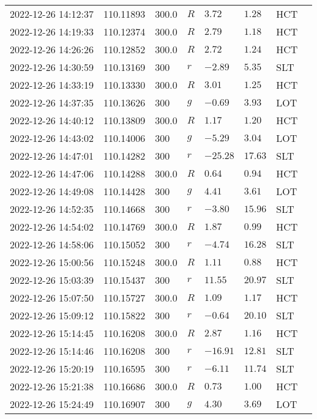 \documentclass{nature_plusfigure}
\begin{document}
\begin{supplement}
\begin{center}
\begin{longtable}{llllllll}
2022-12-26 14:12:37 & 110.11893 & 300.0 & $R$ & $3.72$ & $1.28$ & HCT &  \\ 
2022-12-26 14:19:33 & 110.12374 & 300.0 & $R$ & $2.79$ & $1.18$ & HCT &  \\ 
2022-12-26 14:26:26 & 110.12852 & 300.0 & $R$ & $2.72$ & $1.24$ & HCT &  \\ 
2022-12-26 14:30:59 & 110.13169 & 300 & $r$ & $-2.89$ & $5.35$ & SLT &  \\ 
2022-12-26 14:33:19 & 110.13330 & 300.0 & $R$ & $3.01$ & $1.25$ & HCT &  \\ 
2022-12-26 14:37:35 & 110.13626 & 300 & $g$ & $-0.69$ & $3.93$ & LOT &  \\ 
2022-12-26 14:40:12 & 110.13809 & 300.0 & $R$ & $1.17$ & $1.20$ & HCT &  \\ 
2022-12-26 14:43:02 & 110.14006 & 300 & $g$ & $-5.29$ & $3.04$ & LOT &  \\ 
2022-12-26 14:47:01 & 110.14282 & 300 & $r$ & $-25.28$ & $17.63$ & SLT &  \\ 
2022-12-26 14:47:06 & 110.14288 & 300.0 & $R$ & $0.64$ & $0.94$ & HCT &  \\ 
2022-12-26 14:49:08 & 110.14428 & 300 & $g$ & $4.41$ & $3.61$ & LOT &  \\ 
2022-12-26 14:52:35 & 110.14668 & 300 & $r$ & $-3.80$ & $15.96$ & SLT &  \\ 
2022-12-26 14:54:02 & 110.14769 & 300.0 & $R$ & $1.87$ & $0.99$ & HCT &  \\ 
2022-12-26 14:58:06 & 110.15052 & 300 & $r$ & $-4.74$ & $16.28$ & SLT &  \\ 
2022-12-26 15:00:56 & 110.15248 & 300.0 & $R$ & $1.11$ & $0.88$ & HCT &  \\ 
2022-12-26 15:03:39 & 110.15437 & 300 & $r$ & $11.55$ & $20.97$ & SLT &  \\ 
2022-12-26 15:07:50 & 110.15727 & 300.0 & $R$ & $1.09$ & $1.17$ & HCT &  \\ 
2022-12-26 15:09:12 & 110.15822 & 300 & $r$ & $-0.64$ & $20.10$ & SLT &  \\ 
2022-12-26 15:14:45 & 110.16208 & 300.0 & $R$ & $2.87$ & $1.16$ & HCT &  \\ 
2022-12-26 15:14:46 & 110.16208 & 300 & $r$ & $-16.91$ & $12.81$ & SLT &  \\ 
2022-12-26 15:20:19 & 110.16595 & 300 & $r$ & $-6.11$ & $11.74$ & SLT &  \\ 
2022-12-26 15:21:38 & 110.16686 & 300.0 & $R$ & $0.73$ & $1.00$ & HCT &  \\ 
2022-12-26 15:24:49 & 110.16907 & 300 & $g$ & $4.30$ & $3.69$ & LOT &  \\ 

\end{longtable}
\end{center}
\end{supplement}
\end{document}
